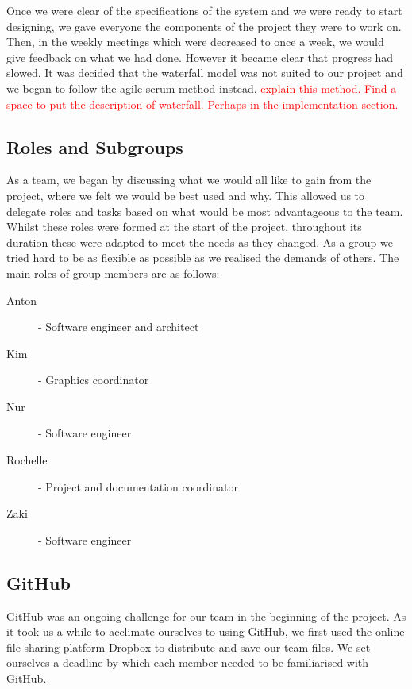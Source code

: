 \documentclass{article}
\begin{document}
	Once we were clear of the specifications of the system and we were ready to start designing, we gave everyone the components of the project they were to work on. Then, in the weekly meetings which were decreased to once a week, we would give feedback on what we had done. However it became clear that progress had slowed. It was decided that the waterfall model was not suited to our project and we began to follow the agile scrum method instead. \textcolor{red}{explain this method. Find a space to put the description of waterfall. Perhaps in the implementation section.}
	
	
	\subsection{Roles and Subgroups}
	
	As a team, we began by discussing what we would all like to gain from the project, where we felt we would be best used and why. 
	This allowed us to delegate roles and tasks based on what would be most advantageous to the team. 
	Whilst these roles were formed at the start of the project, throughout its duration these were adapted to meet the needs as they changed. 
	As a group we tried hard to be as flexible as possible as we realised the demands of others.
	The main roles of group members are as follows:
	
	\begin{description}
		\item [Anton] - Software engineer and architect
		\item [Kim] - Graphics coordinator
		\item [Nur] - Software engineer
		\item [Rochelle] - Project and documentation coordinator
		\item [Zaki] - Software engineer
	\end{description}
	
	
	\subsection{GitHub}
    
    GitHub was an ongoing challenge for our team in the beginning of the project. As it took us a while to acclimate ourselves to using GitHub, we first used the online file-sharing platform Dropbox to distribute and save our team files. We set ourselves a deadline by which each member needed to be familiarised with GitHub.
    
\end{document}
